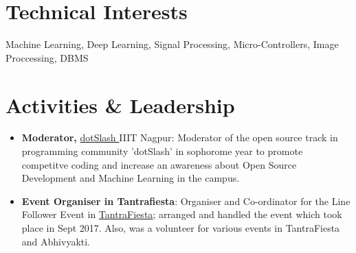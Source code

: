 \documentclass[a4paper,10pt]{extarticle} %
\begin{document}
\vspace{-0.3cm}
\section{\textcolor{primary}{Technical Interests}}

\noindent Machine Learning, Deep Learning, Signal Processing, Micro-Controllers, Image Proccessing, DBMS \\


\vspace{-0.3cm}
\section{\textcolor{primary}{Activities \& Leadership}}

\begin{itemize}[leftmargin=0.55cm, rightmargin=0.2cm, label={\Large\textbullet}]
\item \textbf{Moderator, }\href{https://google.com/}{ dotSlash  }IIIT Nagpur: Moderator of the open source track in programming community 'dotSlash' in sophorome year to promote competitve coding and increase an awareness about Open Source Development and Machine Learning in the campus.
\item \textbf{Event Organiser in Tantrafiesta}: Organiser and Co-ordinator for the Line Follower Event in \href{https://google.com}{TantraFiesta}; arranged and handled the event which took place in Sept 2017. Also, was a volunteer for various events in TantraFiesta and Abhivyakti.
\\
\end{itemize}



\end{document}
